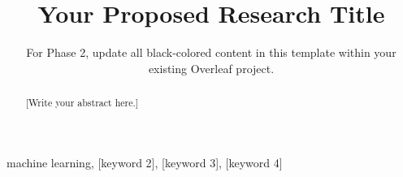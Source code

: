 \documentclass[conference]{IEEEtran}
\begin{document}

\title{Your Proposed Research Title}

\author{
{\color{blue} For Phase 2, update all black-colored content in this template within your existing Overleaf project.}}

\maketitle




\begin{abstract}

%
%
%
%
%
%
%
%

[Write your abstract here.]

\end{abstract}


\begin{IEEEkeywords}
machine learning, [keyword 2], [keyword 3], [keyword 4]
\end{IEEEkeywords}


\end{document}
